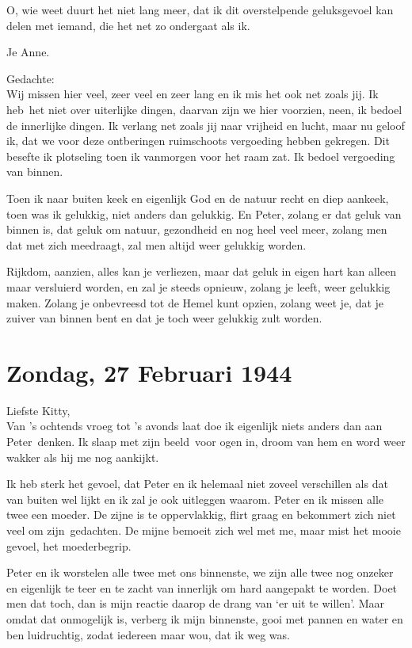 \documentclass{book}
\begin{document}
O, wie weet duurt het niet lang meer, dat ik dit overstelpende geluksgevoel kan
delen met iemand, die het net zo ondergaat als ik.

Je Anne.

Gedachte:\\
Wij missen hier veel, zeer veel en zeer lang en ik mis het ook net
zoals jij. Ik heb~het niet over uiterlijke dingen, daarvan zijn we hier
voorzien, neen, ik bedoel de innerlijke dingen. Ik verlang net zoals jij naar
vrijheid en lucht, maar nu geloof ik, dat we voor deze ontberingen ruimschoots
vergoeding hebben gekregen. Dit besefte ik plotseling toen ik vanmorgen voor het
raam zat. Ik bedoel vergoeding van binnen.

Toen ik naar buiten keek en eigenlijk God en de natuur recht en diep aankeek,
toen was ik gelukkig, niet anders dan gelukkig. En Peter, zolang er dat geluk
van binnen is, dat geluk om natuur, gezondheid en nog heel veel meer, zolang men
dat met zich meedraagt, zal men altijd weer gelukkig worden.

Rijkdom, aanzien, alles kan je verliezen, maar dat geluk in eigen hart kan
alleen maar versluierd worden, en zal je steeds opnieuw, zolang je leeft, weer
gelukkig maken. Zolang je onbevreesd tot de Hemel kunt opzien, zolang weet je,
dat je zuiver van binnen bent en dat je toch weer gelukkig zult worden.

\section*{Zondag, 27 Februari 1944}

Liefste Kitty,\\
Van 's ochtends vroeg tot 's avonds laat doe ik eigenlijk niets
anders dan aan Peter~denken. Ik slaap met zijn beeld~voor ogen in, droom van hem
en word weer wakker als hij me nog aankijkt.

Ik heb sterk het gevoel, dat Peter en ik helemaal niet zoveel verschillen als
dat van buiten wel lijkt en ik zal je ook uitleggen waarom. Peter en ik missen
alle twee een moeder. De zijne is te oppervlakkig, flirt graag en bekommert zich
niet veel om zijn~gedachten.  De mijne bemoeit zich wel met me, maar mist het
mooie gevoel, het moederbegrip.

Peter en ik worstelen alle twee met ons binnenste, we zijn alle twee nog onzeker
en eigenlijk te teer en te zacht van innerlijk om hard aangepakt te worden. Doet
men dat toch, dan is mijn reactie daarop de drang van `er uit te willen'. Maar
omdat dat onmogelijk is, verberg ik mijn binnenste, gooi met pannen en water en
ben luidruchtig, zodat iedereen maar wou, dat ik weg was.
\end{document}
